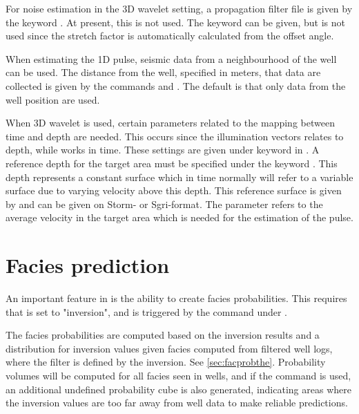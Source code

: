 For noise estimation in the 3D wavelet setting, a propagation filter
file is given by the keyword . At
present, this is not used. The keyword  can be
given, but is not used since the stretch factor is automatically
calculated from the offset angle. 

When estimating the 1D pulse, seismic data from a neighbourhood of the
well can be used. The distance from the well, specified in meters,
that data are collected is given by the commands
 and
. The default is that only data from
the well position are used.   

When 3D wavelet is used, certain parameters related to the mapping
between time and depth are needed. This occurs since the illumination
vectors relates to depth, while \crava works in time. These
settings are given under keyword
 in . A 
reference depth for the target area must be specified under the keyword
. This depth represents a constant surface which 
in time normally will refer to a variable surface due to varying
velocity above this depth. This reference surface is given by
 and can be given on Storm- or
Sgri-format. The parameter  refers to the average
velocity in the target area which is needed for the estimation of the
pulse.  

\section{Facies prediction}
An important feature in \crava is the ability to create facies
probabilities. This requires that  is set to "inversion", and
is triggered by the  command under
. 


The facies probabilities are computed based on the inversion results
and a distribution for inversion values given facies computed from
filtered well logs, where the filter is defined by the inversion. See
\autoref{sec:facprobthe}. Probability volumes will be computed for all
facies seen in wells, and if the command
is used, an additional undefined probability cube is
also generated, indicating areas where the inversion values are too
far away from well data to make reliable predictions. 


